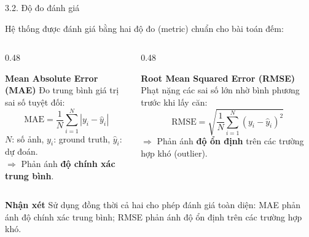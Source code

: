\documentclass[11pt]{beamer}
\begin{document}
\begin{frame}{3.2. Độ đo đánh giá}
\scriptsize

Hệ thống được đánh giá bằng hai độ đo (metric) chuẩn cho bài toán đếm:

\vspace{0.5em}

\begin{columns}[T,onlytextwidth]
\begin{column}{0.48\textwidth}

\begin{block}{\textbf{Mean Absolute Error (MAE)}}
Đo trung bình giá trị sai số tuyệt đối:
\[
\mathrm{MAE} = \frac{1}{N}\sum_{i=1}^{N}\left|y_i - \hat{y}_i\right|
\]
$N$: số ảnh, $y_i$: ground truth, $\hat{y}_i$: dự đoán.\\[0.3em]
$\Rightarrow$ Phản ánh \textbf{độ chính xác trung bình}.
\end{block}

\end{column}

\begin{column}{0.48\textwidth}

\begin{block}{\textbf{Root Mean Squared Error (RMSE)}}
Phạt nặng các sai số lớn nhờ bình phương trước khi lấy căn:
\[
\mathrm{RMSE} = \sqrt{\frac{1}{N}\sum_{i=1}^{N}(y_i - \hat{y}_i)^2}
\]
$\Rightarrow$ Phản ánh \textbf{độ ổn định} trên các trường hợp khó (outlier).
\end{block}

\end{column}
\end{columns}

\vspace{0.5em}

\begin{block}{\textbf{Nhận xét}}
Sử dụng đồng thời cả hai cho phép đánh giá toàn diện: MAE phản ánh độ chính xác trung bình; RMSE phản ánh độ ổn định trên các trường hợp khó.
\end{block}

\end{frame}
\end{document}
